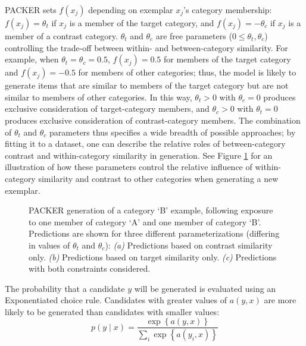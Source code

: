 \documentclass[12pt]{article}
\newcommand\inputpgf[2]{{
\let\pgfimageWithoutPath\pgfimage
\renewcommand{\pgfimage}[2][]{\pgfimageWithoutPath[##1]{#1/##2}}

}}
\begin{document}
\begin{flushleft}
PACKER sets $f(x_j)$ depending on exemplar $x_j$'s category membership:
$f(x_j) = \theta_t$ if $x_j$ is a member of the target category, and
$f(x_j) = -\theta_c$ if $x_j$ is a member of a contrast category. $\theta_t$ and
$\theta_c$ are free parameters ($0 \leq \theta_t,\theta_c$) controlling the
trade-off between within- and between-category similarity. For example, when
$\theta_t = \theta_c = 0.5$, $f(x_j) = 0.5$ for members of the target category
and $f(x_j) = -0.5$ for members of other categories; thus, the model is likely
to generate items that are similar to members of the target category but are not
similar to members of other categories. In this way, $\theta_t > 0$ with
$\theta_c = 0$ produces exclusive consideration of target-category members, and
$\theta_c > 0$ with $\theta_t = 0$ produces exclusive consideration of
contrast-category members. The combination of $\theta_t$ and $\theta_c$
parameters thus specifies a wide breadth of possible approaches; by fitting it
to a dataset, one can describe the relative roles of between-category contrast
and within-category similarity in generation. See Figure
\ref{fig:packer-examples} for an illustration of how these parameters control
the relative influence of within-category similarity and contrast to other
categories when generating a new exemplar.

\begin{figure}
	\begin{center} \inputpgf{figs/}{packer-examples.pgf}
      \caption{PACKER generation of a category `B' example, following exposure
        to one member of category `A' and one member of category `B'.
        Predictions are shown for three different parameterizations (differing
        in values of $\theta_t$ and $\theta_c$): {\em (a)}
        Predictions based on contrast similarity only. {\em (b)}
        Predictions based on target similarity only. {\em (c)} Predictions with
        both constraints considered.}
		\label{fig:packer-examples}
	\end{center}
\end{figure}

The probability that a candidate $y$ will be generated is evaluated using an
Exponentiated \citet{luce1977choice} choice rule. Candidates with greater values
of $a(y,x)$ are more likely to be generated than candidates with smaller values:
% 
\begin{equation} p(y \mid x) = \dfrac { \exp \left \{ a \left( y, x
\right) \right \} } { \sum_i{ \exp \left \{ a \left( y_i, x \right)
\right\} } }
\label{eq:packer-choice}
\end{equation}
% 


\end{flushleft}
\end{document}
